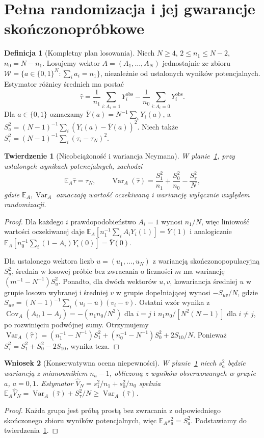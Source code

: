 \documentclass[11pt,a4paper,oneside]{report}
\numberwithin{equation}{chapter}
\theoremstyle{plain}
\newtheorem{twierdzenie}{Twierdzenie}[chapter]
\newtheorem{wniosek}[twierdzenie]{Wniosek}
\theoremstyle{definition}
\newtheorem{definicja}{Definicja}[chapter]
\theoremstyle{remark}
\newcommand{\E}{\mathbb E}
\newcommand{\Var}{\operatorname{Var}}
\newcommand{\Cov}{\operatorname{Cov}}
\begin{document}
\section{Pełna randomizacja i jej gwarancje skończonopróbkowe}
\begin{definicja}[Kompletny plan losowania]\label{def:complete-randomization}
Niech $N\ge4$, $2\le n_1\le N-2$, $n_0=N-n_1$. Losujemy wektor $A=(A_1,\ldots,A_N)$ jednostajnie ze zbioru
$\mathcal W=\{a\in\{0,1\}^N:\sum_i a_i=n_1\}$, niezależnie od ustalonych wyników potencjalnych. Estymator różnicy średnich ma postać
\[
\widehat\tau=\frac1{n_1}\sum_{i:A_i=1}Y_i^{\mathrm{obs}}-\frac1{n_0}\sum_{i:A_i=0}Y_i^{\mathrm{obs}}.
\]
Dla $a\in\{0,1\}$ oznaczamy $\bar Y(a)=N^{-1}\sum_iY_i(a)$, a $S_a^2=(N-1)^{-1}\sum_i(Y_i(a)-\bar Y(a))^2$. Niech także $S_\tau^2=(N-1)^{-1}\sum_i(\tau_i-\tau_N)^2$.
\end{definicja}

\begin{twierdzenie}[Nieobciążoność i wariancja Neymana]\label{thm:neyman-variance}
W planie~\ref{def:complete-randomization}, przy ustalonych wynikach potencjalnych, zachodzi
\[
\E_A\widehat\tau=\tau_N,\qquad
\Var_A(\widehat\tau)=\frac{S_1^2}{n_1}+\frac{S_0^2}{n_0}-\frac{S_\tau^2}{N},
\]
gdzie $\E_A,\Var_A$ oznaczają wartość oczekiwaną i wariancję wyłącznie względem randomizacji.
\end{twierdzenie}
\begin{proof}
Dla każdego $i$ prawdopodobieństwo $A_i=1$ wynosi $n_1/N$, więc liniowość wartości oczekiwanej daje $\E_A[n_1^{-1}\sum_i A_iY_i(1)]=\bar Y(1)$ i analogicznie $\E_A[n_0^{-1}\sum_i(1-A_i)Y_i(0)]=\bar Y(0)$.

Dla ustalonego wektora liczb $u=(u_1,\ldots,u_N)$ z wariancją skończonopopulacyjną $S_u^2$, średnia w losowej próbie bez zwracania o liczności $m$ ma wariancję $(m^{-1}-N^{-1})S_u^2$. Ponadto, dla dwóch wektorów $u,v$, kowariancja średniej $u$ w grupie losowo wybranej i średniej $v$ w grupie dopełniającej wynosi $-S_{uv}/N$, gdzie $S_{uv}=(N-1)^{-1}\sum_i(u_i-\bar u)(v_i-\bar v)$. Ostatni wzór wynika z $\Cov_A(A_i,1-A_j)=-(n_1n_0/N^2)$ dla $i=j$ i $n_1n_0/[N^2(N-1)]$ dla $i\ne j$, po rozwinięciu podwójnej sumy. Otrzymujemy
$\Var_A(\widehat\tau)=(n_1^{-1}-N^{-1})S_1^2+(n_0^{-1}-N^{-1})S_0^2+2S_{10}/N$.
Ponieważ $S_\tau^2=S_1^2+S_0^2-2S_{10}$, wynika teza.
\end{proof}

\begin{wniosek}[Konserwatywna ocena niepewności]\label{cor:neyman-se}
W planie~\ref{def:complete-randomization} niech $s_a^2$ będzie wariancją z mianownikiem $n_a-1$, obliczoną z wyników obserwowanych w grupie $a$, $a=0,1$. Estymator
$\widehat V_N=s_1^2/n_1+s_0^2/n_0$ spełnia $\E_A\widehat V_N=\Var_A(\widehat\tau)+S_\tau^2/N\ge\Var_A(\widehat\tau)$.
\end{wniosek}
\begin{proof}
Każda grupa jest próbą prostą bez zwracania z odpowiedniego skończonego zbioru wyników potencjalnych, więc $\E_As_a^2=S_a^2$. Podstawiamy do twierdzenia~\ref{thm:neyman-variance}.
\end{proof}
\end{document}
